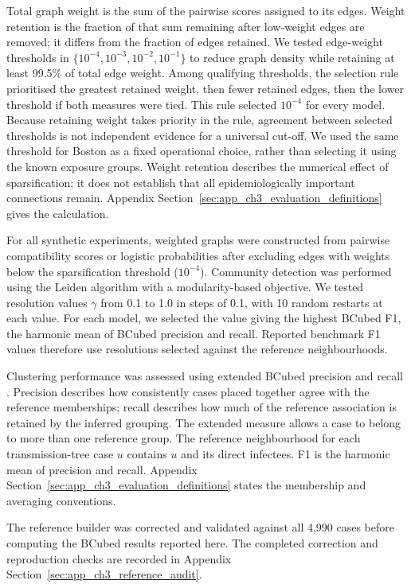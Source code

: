 Total graph weight is the sum of the pairwise scores assigned to its edges. Weight retention is the fraction of that sum remaining after low-weight edges are removed; it differs from the fraction of edges retained. We tested edge-weight thresholds in $\{10^{-4},10^{-3},10^{-2},10^{-1}\}$ to reduce graph density while retaining at least 99.5\% of total edge weight. Among qualifying thresholds, the selection rule prioritised the greatest retained weight, then fewer retained edges, then the lower threshold if both measures were tied. This rule selected $10^{-4}$ for every model. Because retaining weight takes priority in the rule, agreement between selected thresholds is not independent evidence for a universal cut-off. We used the same threshold for Boston as a fixed operational choice, rather than selecting it using the known exposure groups. Weight retention describes the numerical effect of sparsification; it does not establish that all epidemiologically important connections remain. Appendix Section~\ref{sec:app_ch3_evaluation_definitions} gives the calculation.

For all synthetic experiments, weighted graphs were constructed from pairwise compatibility scores or logistic probabilities after excluding edges with weights below the sparsification threshold ($10^{-4}$). Community detection was performed using the Leiden algorithm \citep{Traag2019} with a modularity-based objective. We tested resolution values $\gamma$ from 0.1 to 1.0 in steps of 0.1, with 10 random restarts at each value. For each model, we selected the value giving the highest BCubed F1, the harmonic mean of BCubed precision and recall. Reported benchmark F1 values therefore use resolutions selected against the reference neighbourhoods.

Clustering performance was assessed using extended BCubed precision and recall \citep{Amigo2008}. Precision describes how consistently cases placed together agree with the reference memberships; recall describes how much of the reference association is retained by the inferred grouping. The extended measure allows a case to belong to more than one reference group. The reference neighbourhood for each transmission-tree case $u$ contains $u$ and its direct infectees. F1 is the harmonic mean of precision and recall. Appendix Section~\ref{sec:app_ch3_evaluation_definitions} states the membership and averaging conventions.

The reference builder was corrected and validated against all 4,990 cases before computing the BCubed results reported here. The completed correction and reproduction checks are recorded in Appendix Section~\ref{sec:app_ch3_reference_audit}.

